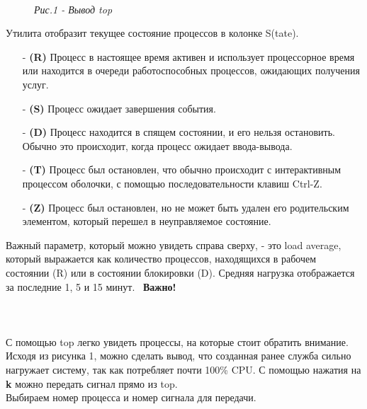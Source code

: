 \documentclass[14pt, a4paper]{article}
\begin{document}
\begin{figure}[h]
    \centering
    \\ 
    \small\textit{Рис.1 - Вывод top}  
    \label{framework} 
\end{figure}

Утилита отобразит текущее состояние процессов в колонке S(tate).
\begin{itemize}
    \item[-] \textbf{(R)} Процесс в настоящее время активен и использует процессорное время или находится в
    очереди работоспособных процессов, ожидающих получения услуг.
    \item[-] \textbf{(S)} Процесс ожидает завершения события.
    \item[-] \textbf{(D)} Процесс находится в спящем состоянии, и его нельзя остановить. Обычно это происходит,
    когда процесс ожидает ввода-вывода.
    \item[-] \textbf{(T)} Процесс был остановлен, что обычно происходит с интерактивным процессом оболочки, с
    помощью последовательности клавиш Ctrl-Z.
    \item[-] \textbf{(Z)} Процесс был остановлен, но не может быть удален его родительским элементом, который
    перешел в неуправляемое состояние.
\end{itemize}

Важный параметр, который можно увидеть справа сверху, - это load average, который выражается как
количество процессов, находящихся в рабочем состоянии (R) или в состоянии блокировки (D).
Средняя нагрузка отображается за последние 1, 5 и 15 минут. 
\ \textbf{Важно!} \  \\
 \\
 \\
\\

С помощью top легко увидеть процессы, на которые стоит обратить внимание. Исходя из рисунка 1,
можно сделать вывод, что созданная ранее служба сильно нагружает систему, так как потребляет
почти 100\% CPU. С помощью нажатия на \textbf{k} можно передать сигнал прямо из top.\\

Выбираем номер процесса и номер сигнала для передачи.
\vspace{0.3cm}
\end{document}

